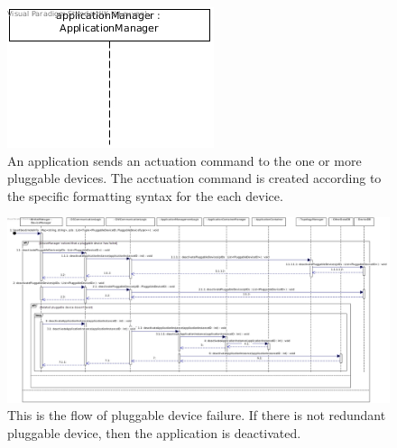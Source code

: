     \begin{figure}[!htp]
    	\centering
    	\includegraphics[width=\textwidth]{images/sequence-UC12}
    	\caption[Applications issuing actuation commands]{An application sends an actuation command to the one or more pluggable devices. The acctuation command is
    	 created according to the specific formatting syntax for the each device. }\label{fig:seq_scenario3}
    \end{figure}

    \begin{figure}[!htp]
    	\centering
    	\includegraphics[width=\textwidth]{images/sequence-Av3-UC14-UC18}
    	\caption[Scenario ]{This is the flow of pluggable device failure. If there is not redundant pluggable device, then the application is deactivated.}\label{fig:seq_scenario4}
    \end{figure}

